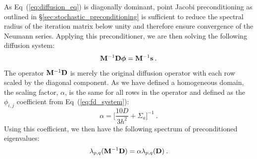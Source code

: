 As Eq~(\ref{eq:diffusion_eq}) is diagonally dominant, point Jacobi
preconditioning as outlined in \S\ref{sec:stochastic_preconditioning}
is sufficient to reduce the spectral radius of the iteration matrix
below unity and therefore ensure convergence of the Neumann
series. Applying this preconditioner, we are then solving the
following diffusion system:
\begin{equation}
  \mathbf{M}^{-1} \mathbf{D} \boldsymbol{\phi} = \mathbf{M}^{-1} \mathbf{s}\:.
  \label{eq:precond_diffsion}
\end{equation}
The operator $\mathbf{M}^{-1} \mathbf{D}$ is merely the original diffusion
operator with each row scaled by the diagonal component. As we have
defined a homogeneous domain, the scaling factor, $\alpha$, is the
same for all rows in the operator and defined as the $\phi_{i,j}$
coefficient from Eq~(\ref{eq:fd_system}):
\begin{equation}
  \alpha = \Bigg[\frac{10 D}{3 h^2} + \Sigma_a\Bigg]^{-1}\:.
  \label{eq:jacobi_scaling}
\end{equation}
Using this coefficient, we then have the following spectrum of
preconditioned eigenvalues:
\begin{equation}
  \lambda_{p,q}(\mathbf{M}^{-1} \mathbf{D}) = \alpha \lambda_{p,q}(\mathbf{D})\:.
  \label{eq:preconditioned_eigenvalues}
\end{equation}

